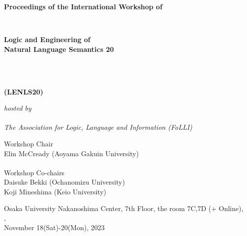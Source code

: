\documentclass[12pt]{jarticle}
\begin{document}
\pagestyle{empty}

\vspace*{1cm}

\begin{center}

\begin{Large}
{\bf Proceedings of the International Workshop of}
\end{Large} 
\\
\begin{huge}
{\bf Logic and Engineering of \\
Natural Language Semantics 20} 
\end{huge}
\\\ \\
\begin{huge}
{\bf (LENLS20)}
\end{huge}

\vspace*{1cm}

\begin{Large}
{\em hosted by \\\ \\ The Association for Logic, Language and Information (FoLLI)}
\end{Large}

\begin{large}
\vspace*{1cm}
Workshop Chair\\ $\;$\\
Elin McCready (Aoyama Gakuin University) \\
\ \\
Workshop Co-chairs\\ $\;$\\
Daisuke Bekki (Ochanomizu University) \\
Koji Mineshima (Keio University) \\

\end{large}

\vspace*{3cm}


\vspace*{1cm}

\begin{large}
Osaka University Nakanoshima Center, 7th Floor, the room 7C,7D (+ Online), \\
, \\
November 18(Sat)-20(Mon), 2023
\end{large}
\vfill

\end{center}
\end{document}
